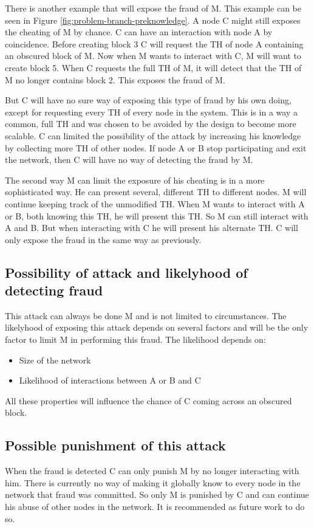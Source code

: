 There is another example that will expose the fraud of M.
This example can be seen in Figure \ref{fig:problem-branch-preknowledge}.
A node C might still exposes the cheating of M by chance.
C can have an interaction with node A by coincidence.
Before creating block 3 C will request the TH of node A containing an obscured block of M.
Now when M wants to interact with C, M will want to create block 5.
When C requests the full TH of M, it will detect that the TH of M no longer contains block 2.
This exposes the fraud of M.

But C will have no sure way of exposing this type of fraud by his own doing,
except for requesting every TH of every node in the system.
This is in a way a common, full TH and was chosen to be avoided by the design to become more scalable.
C can limited the possibility of the attack by increasing his knowledge by collecting more TH of other nodes.
If node A or B stop participating and exit the network,
then C will have no way of detecting the fraud by M.

The second way M can limit the exposure of his cheating is in a more sophisticated way.
He can present several, different TH to different nodes.
M will continue keeping track of the unmodified TH.
When M wants to interact with A or B, both knowing this TH, he will present this TH.
So M can still interact with A and B.
But when interacting with C he will present his alternate TH.
C will only expose the fraud in the same way as previously.

\subsection{Possibility of attack and likelyhood of detecting fraud}
This attack can always be done M and is not limited to circumstances.
The likelyhood of exposing this attack depends on several factors
and will be the only factor to limit M in performing this fraud.
The likelihood depends on:
\begin{itemize}
\item Size of the network
\item Likelihood of interactions between A or B and C
\end{itemize}

All these properties will influence the chance of C coming across an obscured block.

\subsection{Possible punishment of this attack}
When the fraud is detected C can only punish M by no longer interacting with him.
There is currently no way of making it globally know to every node in the network that fraud was committed.
So only M is punished by C and can continue his abuse of other nodes in the network.
It is recommended as future work to do so.

